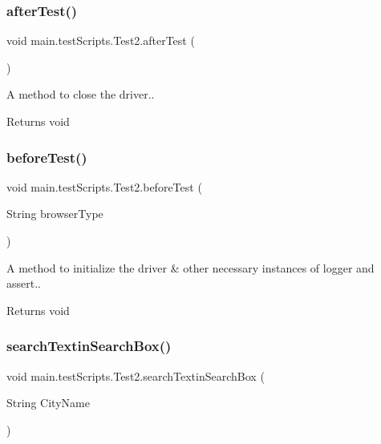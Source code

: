 \subsubsection{\texorpdfstring{after\+Test()}{afterTest()}}
{\footnotesize\ttfamily void main.\+test\+Scripts.\+Test2.\+after\+Test (\begin{DoxyParamCaption}{ }\end{DoxyParamCaption})}

A  method to close the driver.. \begin{DoxyReturn}{Returns}
void 
\end{DoxyReturn}
\mbox{\label{classmain_1_1test_scripts_1_1_test2_add17ccdd24a07f4d61763a91b58071ff}} 
\subsubsection{\texorpdfstring{before\+Test()}{beforeTest()}}
{\footnotesize\ttfamily void main.\+test\+Scripts.\+Test2.\+before\+Test (\begin{DoxyParamCaption}\item[{String}]{browser\+Type }\end{DoxyParamCaption})}

A  method to initialize the driver \& other necessary instances of logger and assert.. \begin{DoxyReturn}{Returns}
void 
\end{DoxyReturn}
\mbox{\label{classmain_1_1test_scripts_1_1_test2_a6607310c15cc4d9f1ff7194d1cadf479}} 
\subsubsection{\texorpdfstring{search\+Textin\+Search\+Box()}{searchTextinSearchBox()}}
{\footnotesize\ttfamily void main.\+test\+Scripts.\+Test2.\+search\+Textin\+Search\+Box (\begin{DoxyParamCaption}\item[{String}]{City\+Name }\end{DoxyParamCaption})}

